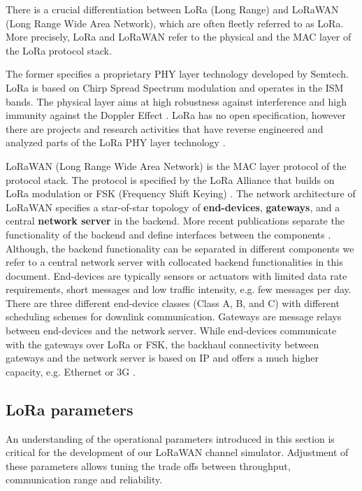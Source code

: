 \documentclass{article}
\begin{document}
There is a crucial differentiation between LoRa (Long Range) and LoRaWAN (Long
Range Wide Area Network), which are often fleetly referred to as LoRa. More
precisely, LoRa and LoRaWAN refer to the physical and the MAC layer of the LoRa
protocol stack.

The former specifies a proprietary PHY layer technology developed by Semtech.
LoRa is based on Chirp Spread Spectrum modulation and operates in the ISM
bands. The physical layer aims at high robustness against interference and high
immunity against the Doppler Effect \cite{augustin2016study,
loramodulationbasics}. LoRa has no open specification, however there are
projects and research activities that have reverse engineered and analyzed
parts of the LoRa PHY layer technology \cite{knight2016decoding,
sikkendecodinglora}.

LoRaWAN (Long Range Wide Area Network) is the MAC layer protocol of the
protocol stack. The protocol is specified by the LoRa Alliance that builds on
LoRa modulation or FSK (Frequency Shift Keying) \cite{lorawanspec}. The network
architecture of LoRaWAN specifies a star-of-star topology of
\textbf{end-devices}, \textbf{gateways}, and a central \textbf{network server}
in the backend. More recent publications separate the functionality of the
backend and define interfaces between the components \cite{lorawanbackend}.
Although, the backend functionality can be separated in different components we
refer to a central network server with collocated backend functionalities in
this document. End-devices are typically sensors or actuators with limited data
rate requirements, short messages and low traffic intensity, e.g. few messages
per day. There are three different end-device classes (Class A, B, and C) with
different scheduling schemes for downlink communication. Gateways are message
relays between end-devices and the network server. While end-devices
communicate with the gateways over LoRa or FSK, the backhaul connectivity
between gateways and the network server is based on IP and offers a much higher
capacity, e.g. Ethernet or 3G \cite{lorawanspec, augustin2016study}.

\subsection{LoRa parameters}
An understanding of the operational parameters introduced in this section is
critical for the development of our LoRaWAN channel simulator. Adjustment of
these parameters allows tuning the trade offs between throughput, communication
range and reliability.\\
\end{document}
